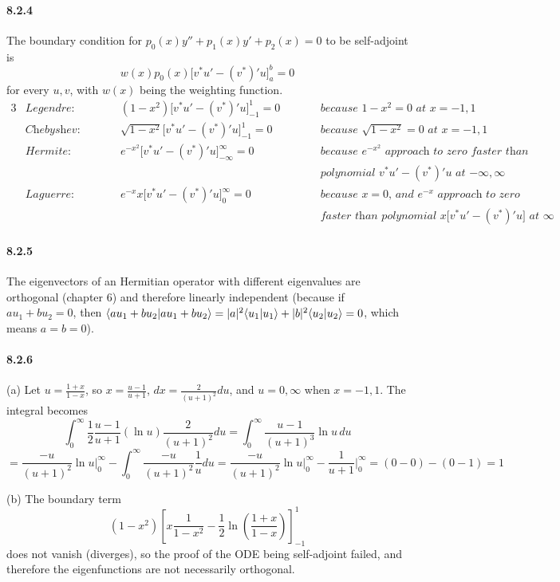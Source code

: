 \documentclass[a4paper]{article}
\begin{document}
\paragraph{8.2.4}
The boundary condition for $p_0(x)y''+p_1(x)y'+p_2(x)=0$ to be self-adjoint is 
\[
w(x)p_0(x)\big[v^*u'-(v^*)'u\big]_a^b=0
\]
for every $u,v$, with $w(x)$ being the weighting function.
\begin{alignat*}{3}
    & \textit{Legendre:}\qquad &&  (1-x^2)\big[v^*u'-(v^*)'u\big]_{-1}^{1}=0 && \qquad \textit{because $1-x^2=0$ at $x=-1,1$}\\
    & \textit{Chebyshev:}\qquad &&  \sqrt{1-x^2}\big[v^*u'-(v^*)'u\big]_{-1}^{1}=0 && \qquad \textit{because $\sqrt{1-x^2}=0$ at $x=-1,1$}\\
    & \textit{Hermite:}\qquad &&  e^{-x^2}\big[v^*u'-(v^*)'u\big]_{-\infty}^{\infty}=0 && \qquad \textit{because $e^{-x^2}$ approach to zero faster than}\\
    & && &&\qquad \textit{polynomial $v^*u'-(v^*)'u$ at $-\infty,\infty$}\\
    & \textit{Laguerre:}\qquad &&  e^{-x}x\big[v^*u'-(v^*)'u\big]_{0}^{\infty}=0 && \qquad \textit{because $x=0$, and $e^{-x}$ approach to zero}\\
    & && &&\qquad \textit{faster than polynomial $x\big[v^*u'-(v^*)'u\big]$ at $\infty$}
\end{alignat*}

\paragraph{8.2.5}
The eigenvectors of an Hermitian operator with different eigenvalues are orthogonal (chapter 6) and therefore linearly independent (because if $au_1+bu_2=0$, then $\langle au_1+bu_2|au_1+bu_2\rangle=|a|^2\langle u_1|u_1\rangle+|b|^2\langle u_2|u_2\rangle=0$, which means $a=b=0$).

\paragraph{8.2.6}
(a) 
Let $u=\frac{1+x}{1-x}$, so $x=\frac{u-1}{u+1}$, $dx=\frac{2}{(u+1)^2}du$, and $u=0,\infty$ when $x=-1,1$. The integral becomes
\[
\int_0^\infty\frac{1}{2}\frac{u-1}{u+1}(\ln u)\frac{2}{(u+1)^2}du
=\int_0^\infty\frac{u-1}{(u+1)^3}\ln u\,du
\]
\[
=\frac{-u}{(u+1)^2}\ln u\Big|_0^\infty-\int_0^\infty\frac{-u}{(u+1)^2}\frac{1}{u}du
=\frac{-u}{(u+1)^2}\ln u\Big|_0^\infty-\frac{1}{u+1}\Big|_0^\infty
=(0-0)-(0-1)=1
\]

(b) 
The boundary term 
\[
(1-x^2)\left[x\frac{1}{1-x^2}-\frac{1}{2}\ln\left(\frac{1+x}{1-x} \right) \right]_{-1}^1
\]
does not vanish (diverges), so the proof of the ODE being self-adjoint failed, and therefore the eigenfunctions are not necessarily orthogonal.
\end{document}
